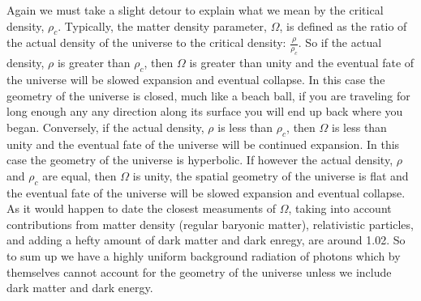\documentclass[12pt]{article} %
\begin{document}
Again we must take a slight detour to explain what we mean by the critical density, $\rho_c$. Typically, the matter density parameter, $\Omega$, is defined as the ratio of the actual density of the universe to the critical density: $\frac{\rho}{\rho_c}$. So if the actual density, $\rho$ is greater than $\rho_c$, then $\Omega$ is greater than unity and the eventual fate of the universe will be slowed expansion and eventual collapse. In this case the geometry of the universe is closed, much like a beach ball, if you are traveling for long enough any any direction along its surface you will end up back where you began. Conversely, if the actual density, $\rho$ is less than $\rho_c$, then $\Omega$ is less than unity and the eventual fate of the universe will be continued expansion. In this case the geometry of the universe is hyperbolic. If however the actual density, $\rho$ and  $\rho_c$ are equal, then $\Omega$ is unity, the spatial geometry of the universe is flat and the eventual fate of the universe will be slowed expansion and eventual collapse. As it would happen to date the closest measuments of $\Omega$, taking into account contributions from matter density (regular baryonic matter), relativistic particles, and adding a hefty amount of dark matter and dark enregy, are around 1.02. So to sum up we have a highly uniform background radiation of photons which by themselves cannot account for the geometry of the universe unless we include dark matter and dark energy. 
\end{document}
